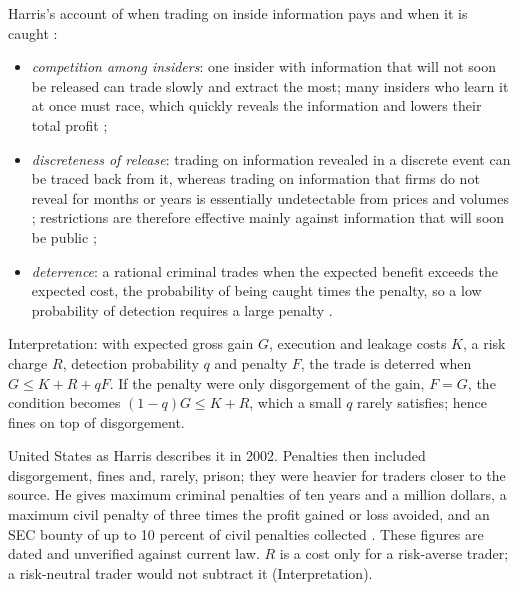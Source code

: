 \begin{qfresult}\label{res:insider-trading-deterrence}
 Harris's account of when trading on inside information pays and when it is caught \citep[secs.~29.2--29.3, pp.~588--595]{alpha-harris}:
\begin{itemize}
\item \emph{competition among insiders}: one insider with information that will not soon be released can trade slowly and extract the most; many insiders who learn it at once must race, which quickly reveals the information and lowers their total profit \citep[sec.~29.3.1.2, p.~592]{alpha-harris};
\item \emph{discreteness of release}: trading on information revealed in a discrete event can be traced back from it, whereas trading on information that firms do not reveal for months or years is essentially undetectable from prices and volumes \citep[sec.~29.2, p.~590]{alpha-harris}; restrictions are therefore effective mainly against information that will soon be public \citep[sec.~29.3.2.1, p.~595]{alpha-harris};
\item \emph{deterrence}: a rational criminal trades when the expected benefit exceeds the expected cost, the probability of being caught times the penalty, so a low probability of detection requires a large penalty \citep[sec.~29.2, p.~590]{alpha-harris}.
\end{itemize}
Interpretation: with expected gross gain $G$, execution and leakage costs $K$, a risk charge $R$, detection probability $q$ and penalty $F$, the trade is deterred when $G\le K+R+qF$. If the penalty were only disgorgement of the gain, $F=G$, the condition becomes $(1-q)G\le K+R$, which a small $q$ rarely satisfies; hence fines on top of disgorgement.

 United States as Harris describes it in 2002. Penalties then included disgorgement, fines and, rarely, prison; they were heavier for traders closer to the source. He gives maximum criminal penalties of ten years and a million dollars, a maximum civil penalty of three times the profit gained or loss avoided, and an SEC bounty of up to 10 percent of civil penalties collected \citep[sec.~29.2, pp.~590--591 and box]{alpha-harris}. These figures are dated and unverified against current law. $R$ is a cost only for a risk-averse trader; a risk-neutral trader would not subtract it (Interpretation).


\end{qfresult}
